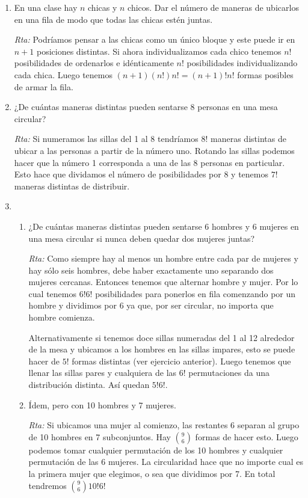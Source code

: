 \documentclass[12pt,spanish,makeidx]{amsbook}
\begin{document}
\begin{enumerate}
\medskip

\item En una clase hay $n$ chicas y $n$ chicos. Dar el número de maneras de ubicarlos en una fila de modo que todas las chicas estén juntas.

\noindent\textit{Rta:} Podríamos pensar a las chicas como un único bloque y este puede ir en $n+1$ posiciones distintas. Si ahora individualizamos cada chico tenemos $n!$ posibilidades de ordenarlos e idénticamente $n!$ posibilidades individualizando cada chica. Luego tenemos $(n+1)(n!)n!=(n+1)!n!$ formas posibles de armar la fila.

\medskip

\item ¿De cuántas maneras distintas pueden sentarse 8 personas en una mesa circular?

\noindent\textit{Rta:} Si numeramos las sillas del 1 al 8 tendríamos $8!$ maneras distintas de ubicar a las personas a partir de la número uno. Rotando las sillas podemos hacer que la número 1 corresponda a una de las 8 personas en particular. Esto hace que dividamos el número de posibilidades por 8 y tenemos $7!$ maneras distintas de distribuir.

\medskip

\item 
\begin{enumerate}
\item 
¿De cuántas maneras distintas pueden sentarse 6 hombres y 6 mujeres en una
mesa circular si nunca deben quedar dos mujeres juntas?

\noindent\textit{Rta:} Como siempre hay al menos un hombre entre cada par de mujeres y hay sólo seis hombres, debe haber exactamente uno separando dos mujeres cercanas. Entonces tenemos que alternar hombre y mujer. Por lo cual tenemos $6!6!$ posibilidades para ponerlos en fila comenzando por un hombre y dividimos por 6 ya que, por ser circular, no importa que hombre comienza. 

Alternativamente si tenemos doce sillas numeradas del 1 al 12 alrededor de la mesa y ubicamos a los hombres en las sillas impares, esto se puede hacer de $5!$ formas distintas (ver ejercicio anterior). Luego tenemos que llenar las sillas pares y cualquiera de las $6!$ permutaciones da una distribución distinta. Así quedan $5!6!$.

\item Ídem, pero con 10 hombres y 7 mujeres.

\noindent\textit{Rta:}  Si ubicamos una mujer al comienzo, las restantes 6 separan al grupo de 10 hombres en 7 subconjuntos. Hay $\binom{9}{6}$ formas de hacer esto.  Luego podemos tomar cualquier permutación de los 10 hombres y cualquier permutación de las 6 mujeres. La circularidad hace que no importe cual es la primera mujer que elegimos, o sea que dividimos por 7. En total tendremos $\binom{9}{6}10!6!$
 

\end{enumerate}
\end{enumerate}
\end{document}

